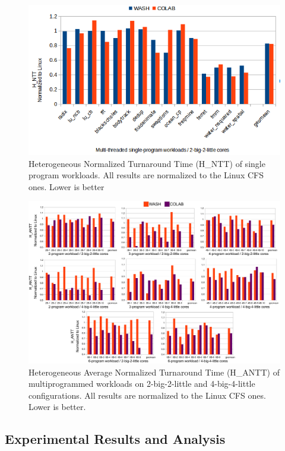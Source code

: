 \begin{figure}
\centering
\includegraphics[scale=0.42]{figures/MSW4.png}
\caption{Heterogeneous Normalized Turnaround Time (H\_NTT) of single program workloads.  All results are normalized to the Linux CFS ones. Lower is better}
\label{MSW}
\end{figure}  
\begin{figure}
\centering
\includegraphics[scale=0.4]{figures/HANTT_NEW.pdf}
\caption{Heterogeneous Average Normalized Turnaround Time (H\_ANTT) of multiprogrammed workloads on 2-big-2-little and 4-big-4-little configurations. All results are normalized to the Linux CFS ones. Lower is better.}
\label{M24W}
\end{figure}


\subsection{Experimental Results and Analysis}

